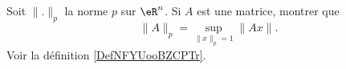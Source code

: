\begin{exercice}\label{exoGeomAnal-0040}

    Soit \( \| . \|_p\) la norme $p$ sur \( \eR^n\). Si \( A\) est une matrice, montrer que
    \begin{equation}
        \| A \|_p=\sup_{\| x \|_p=1}\| Ax \|.
    \end{equation}
    Voir la définition \ref{DefNFYUooBZCPTr}.

\end{exercice}
